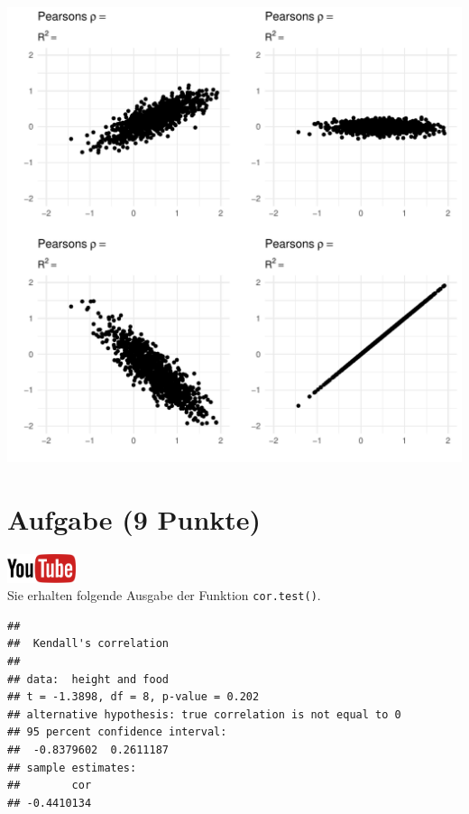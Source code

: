\documentclass[a4paper, 9pt]{scrartcl}\usepackage[]{graphicx}\usepackage[]{xcolor}
\makeatletter
\def\maxwidth{ %
  \ifdim\Gin@nat@width>\linewidth
    \linewidth
  \else
    \Gin@nat@width
  \fi
}
\newenvironment{kframe}{%
 \def\at@end@of@kframe{}%
 \ifinner\ifhmode%
  \def\at@end@of@kframe{\end{minipage}}%
  \begin{minipage}{\columnwidth}%
 \fi\fi%
 \def\FrameCommand##1{\hskip\@totalleftmargin \hskip-\fboxsep
 \colorbox{shadecolor}{##1}\hskip-\fboxsep
     \hskip-\linewidth \hskip-\@totalleftmargin \hskip\columnwidth}%
 \MakeFramed {\advance\hsize-\width
   \@totalleftmargin\z@ \linewidth\hsize
   \@setminipage}}%
 {\par\unskip\endMakeFramed%
 \at@end@of@kframe}
\newenvironment{knitrout}{}{} %
\makeatother
\begin{document}
{\centering \includegraphics[width=\maxwidth]{img/correlation-02-1} 

}



 
\clearpage

\section{Aufgabe \hfill (9 Punkte)}

\hfill\href{https://youtu.be/C9skfFRTHhI}{\includegraphics[width =
   2cm]{img/youtube}}\\[1Ex]

Sie erhalten folgende \Rlogo Ausgabe der Funktion \texttt{cor.test()}.

\begin{knitrout}
\color{fgcolor}\begin{kframe}
\begin{verbatim}
## 
## 	Kendall's correlation
## 
## data:  height and food
## t = -1.3898, df = 8, p-value = 0.202
## alternative hypothesis: true correlation is not equal to 0
## 95 percent confidence interval:
##  -0.8379602  0.2611187
## sample estimates:
##        cor 
## -0.4410134
\end{verbatim}
\end{kframe}
\end{knitrout}
\end{document}
